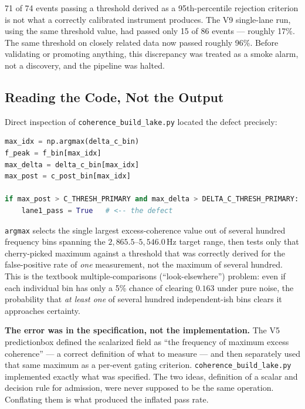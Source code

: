\documentclass[11pt, letterpaper, openany]{book}
\begin{document}
71 of 74 events passing a threshold derived as a 95th-percentile
rejection criterion is not what a correctly calibrated instrument
produces. The V9 single-lane run, using the same threshold value, had
passed only 15 of 86 events --- roughly 17\%. The same threshold on
closely related data now passed roughly 96\%. Before validating or
promoting anything, this discrepancy was treated as a smoke alarm, not a
discovery, and the pipeline was halted.

\subsection*{Reading the Code, Not the Output}

Direct inspection of \texttt{coherence\_build\_lake.py} located the
defect precisely:

\begin{lstlisting}[language=Python, basicstyle=\ttfamily\small]
max_idx = np.argmax(delta_c_bin)
f_peak = f_bin[max_idx]
max_delta = delta_c_bin[max_idx]
max_post = c_post_bin[max_idx]

if max_post > C_THRESH_PRIMARY and max_delta > DELTA_C_THRESH_PRIMARY:
    lane1_pass = True   # <-- the defect
\end{lstlisting}

\texttt{argmax} selects the single largest excess-coherence value out of
several hundred frequency bins spanning the $2{,}865.5$--$5{,}546.0$\,Hz
target range, then tests only that cherry-picked maximum against a
threshold that was correctly derived for the false-positive rate of
\emph{one} measurement, not the maximum of several hundred. This is the
textbook multiple-comparisons (``look-elsewhere'') problem: even if each
individual bin has only a 5\% chance of clearing $0.163$ under pure
noise, the probability that \emph{at least one} of several hundred
independent-ish bins clears it approaches certainty.

\begin{warningbox}
\textbf{The error was in the specification, not the implementation.}
The V5 predictionbox defined the scalarized field as ``the frequency of
maximum excess coherence'' --- a correct definition of what to measure
--- and then separately used that same maximum as a per-event gating
criterion. \texttt{coherence\_build\_lake.py} implemented exactly what
was specified. The two ideas, definition of a scalar and decision rule
for admission, were never supposed to be the same operation. Conflating
them is what produced the inflated pass rate.
\end{warningbox}
\end{document}
